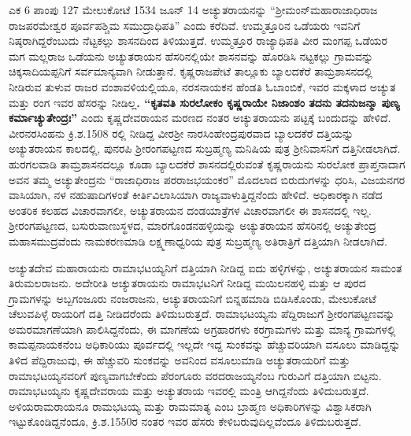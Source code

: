 {ಎಕ 6 ಪಾಂಪು 127 ಮೇಲುಕೋಟೆ 1534 ಜೂನ್​ 14} ಅಚ್ಯುತರಾಯನನ್ನು “ಶ‍್ರೀಮಂನ್​ ಮಹಾರಾಜಾಧಿರಾಜ ರಾಜಪರಮೇಶ್ವರ ಪೂರ್ವಪಶ್ಚಿಮ ಸಮುದ್ರಾಧಿಪತಿ” ಎಂದು ಕರೆದಿವೆ. ಉಮ್ಮತ್ತೂರಿನ ಒಡೆಯರು ಇವನಿಗೆ ನಿಷ್ಠರಾಗಿದ್ದರೆಂಬುದು ನೆಟ್ಟಕಲ್ಲು ಶಾಸನದಿಂದ ತಿಳಿಯುತ್ತದೆ. ಉಮ್ಮತ್ತೂರ ರಾಜ್ಯಾಧಿಪತಿ ವೀರ ಮಂಗಪ್ಪ ಒಡೆಯರ ಮಗ ಮಲ್ಲರಾಜ ಒಡೆಯನು ಅಚ್ಯುತರಾಯನ ಹೆಸರಿನಲ್ಲಿಯೇ ಶಾಸನವನ್ನು ಹೊರಡಿಸಿ ನಟ್ಟಕಲ್ಲು ಗ್ರಾಮವನ್ನು ಚಿಕ್ಕಸಾದಿಯಪ್ಪನಿಗೆ ಸರ್ವಮಾನ್ಯವಾಗಿ ನೀಡುತ್ತಾನೆ. ಕೃಷ್ಣರಾಜಪೇಟೆ ತಾಲ್ಲೂಕು ಬ್ಯಾಲದಕೆರೆ ತಾಮ್ರಶಾಸನದಲ್ಲಿ ನೀಡಿರುವ ತುಳುವ ರಾಜರ ವಂಶಾವಳಿಯಲ್ಲಿಯೂ, ನರಸನಾಯಕನ ಹೆಂಡತಿ ಓಬಾಂಬಿಕೆ, ಇವರ ಮಕ್ಕಳಾದ ಅಚ್ಯುತ ಮತ್ತು ರಂಗ ಇವರ ಹೆಸರನ್ನು ನೀಡಿಲ್ಲ\textbf{. “ಕೃತವತಿ ಸುರಲೋಕಂ ಕೃಷ್ಣರಾಯೇ ನಿಜಾಂಶಂ ತದನು ತದನುಜನ್ಮಾ ಪುಣ್ಯ ಕರ್ಮಾಚ್ಯುತೇಂದ್ರಃ”} ಎಂದು ಕೃಷ್ಣದೇವರಾಯನ ಮರಣದ ನಂತರ ಅಚ್ಯುತರಾಯನು ಪಟ್ಟಕ್ಕೆ ಬಂದುದನ್ನು ಹೇಳಿದೆ. ವೀರನರಸಿಂಹನು ಕ್ರಿ.ಶ.1508 ರಲ್ಲಿ ನೀಡಿದ್ದ ವೀರಶ‍್ರೀ ನಾರಸಿಂಹೇಂದ್ರಪುರವಾದ ಬ್ಯಾಲದಕೆರೆ ದತ್ತಿಯನ್ನು ಅಚ್ಯುತರಾಯನ ಕಾಲದಲ್ಲಿ, ಪುನರಪಿ ಶ‍್ರೀರಂಗಪಟ್ಟಣದ ಸುಬ್ರಹ್ಮಣ್ಯ ಮನಿಷಿಯ ಪುತ್ರ ಶ‍್ರೀನಿವಾಸನಿಗೆ ದತ್ತಿನೀಡಲಾಗಿದೆ. ಹುರಗಲವಾಡಿ ತಾಮ್ರಶಾಸನದಲ್ಲೂ ಕೂಡಾ ಬ್ಯಾಲದಕೆರೆ ಶಾಸನದಲ್ಲಿರುವಂತೆ ಕೃಷ್ಣರಾಯನು ಸುರಲೋಕ ಪ್ರಾಪ್ತನಾದಾಗ ಅವನ ತಮ್ಮ ಅಚ್ಯುತೇಂದ್ರನು “ರಾಜಾಧಿರಾಜ ಪರರಾಜಭಯಂಕರ” ಮೊದಲಾದ ಬಿರುದುಗಳನ್ನು ಧರಿಸಿ, ವಿಜಯನಗರ ವಾಸಿಯಾಗಿ, ನಳ ನಹುಷಾದಿಗಳಂತೆ ಕೀರ್ತಿವಿಲಾಸಿಯಾಗಿ ರಾಜ್ಯವಾಳುತ್ತಿದ್ದನೆಂದು ಹೇಳಿದೆ. ಅಧಿಕಾರಕ್ಕಾಗಿ ನಡೆದ ಅಂತರಿಕ ಕಲಹದ ವಿಚಾರವಾಗಲೀ, ಅಚ್ಯುತರಾಯನ ದಂಡಯಾತ್ರೆಗಳ ವಿಚಾರವಾಗಲೀ ಈ ಶಾಸನದಲ್ಲಿ ಇಲ್ಲ. ಶ‍್ರೀರಂಗಪಟ್ಟಣದ, ಬಸುರುವಾಣುಸ್ಥಳದ, ಮಾರಗೊಂಡನಹಳ್ಳಿಯನ್ನು ಅಚ್ಯುತರಾಯನ ಹೆಸರಿನಲ್ಲಿ ಅಚ್ಯುತೇಂದ್ರ ಮಹಾಸಮುದ್ರವೆಂದು ನಾಮಕರಣಮಾಡಿ ಲಕ್ಷ್ಮಣಾಧ್ವರಿಯ ಪುತ್ರ ಸುಬ್ರಹ್ಮಣ್ಯ ಅತಿರಾತ್ರಿಗೆ ದತ್ತಿಯಾಗಿ ನೀಡಲಾಗಿದೆ.

ಅಚ್ಯುತದೇವ ಮಹಾರಾಯನು ರಾಮಾಭಟಯ್ಯನಿಗೆ ದತ್ತಿಯಾಗಿ ನೀಡಿದ್ದ ಐದು ಹಳ್ಳಿಗಳನ್ನು, ಅಚ್ಯುತರಾಯನ ಸಾಮಂತ ತಿರುಮಲರಾಜನು. ಅದೇರೀತಿ ಅಚ್ಯುತರಾಯನು ರಾಮಾಭಟನಿಗೆ ನೀಡಿದ್ದ ಮಯಿಲನಹಳ್ಳಿ ಮತ್ತು ಆ ಪುರದ ಗ್ರಾಮಗಳನ್ನು ಅಬ್ಬಗಂಜೂರು ನಂಜರಾಜನು, ಅಚ್ಯುತರಾಯನಿಗೆ ಬಿನ್ನಹಮಾಡಿ ಬಿಡಿಸಿಕೊಂಡು, ಮೇಲುಕೋಟೆ ಚೆಲುವಪಿಳ್ಳೆ ರಾಯರಿಗೆ ದತ್ತಿ ನೀಡಿದರೆಂದು ತಿಳಿದುಬರುತ್ತದೆ. ರಾಮಾಭಟಯ್ಯನು ಪೆದ್ದಿರಾಜುಗೆ ಶ‍್ರೀರಂಗಪಟ್ಟಣವನ್ನು ಅಮರಮಾಗಣೆಯಾಗಿ ಪಾಲಿಸಿದ್ದನೆಂದು, ಈ ಮಾಗಣೆಯ ಅಗ್ರಹಾರಗಳು ಕರಗ್ರಾಮಗಳು ಮತ್ತು ಮಾನ್ಯ ಗ್ರಾಮಗಳಲ್ಲಿ ಕಾಮಪ್ಪನಾಯಕನೆಂಬ ಅಧಿಕಾರಿಯು ಪೂರ್ವದಲ್ಲಿ ಇಲ್ಲದೇ ಇದ್ದ ಸುಂಕವನ್ನು ಹೆಚ್ಚುವರಿಯಾಗಿ ವಸೂಲು ಮಾಡಿದ್ದನ್ನು ತಿಳಿದ ಪೆದ್ದಿರಾಜುವು, ಈ ಹೆಚ್ಚುವರಿ ಸುಂಕವನ್ನು ಅವನಿಂದ ವಸೂಲುಮಾಡಿ ಅಚ್ಯುತರಾಯರಿಗೆ ಮತ್ತು ರಾಮಾಭಟಯ್ಯನವರಿಗೆ ಪುಣ್ಯವಾಗಬೇಕೆಂದು ಪೆರಂಗೂರು ವರದರಾಜಯ್ಯನೆಂಬ ಗುರುವಿಗೆ ದತ್ತಿಯಾಗಿ ಬಿಟ್ಟನು. ರಾಮಾಭಟಯ್ಯನು ಕೃಷ್ಣದೇವರಾಯ ಮತ್ತು ಅಚ್ಯುತರಾಯ ಇವರಲ್ಲಿ ಮಂತ್ರಿ ಆಗಿದ್ದನೆಂದು ತಿಳಿದುಬರುತ್ತದೆ. ಅಳಿಯರಾಮರಾಯನೂ ರಾಮಭಟಯ್ಯ ಮತ್ತು ರಾಮಮಾತ್ಯ ಎಂಬ ಬ್ರಾಹ್ಮಣ ಅಧಿಕಾರಿಗಳನ್ನು ವಿಶ್ವಾಸಿಕರಾಗಿ ಇಟ್ಟುಕೊಂಡಿದ್ದನೆಂದೂ, ಕ್ರಿ.ಶ.1550ರ ನಂತರ ಇವರ ಹೆಸರು ಕೇಳಿಬರುವುದಿಲ್ಲವೆಂದೂ ತಿಳಿದುಬರುತ್ತದೆ.


